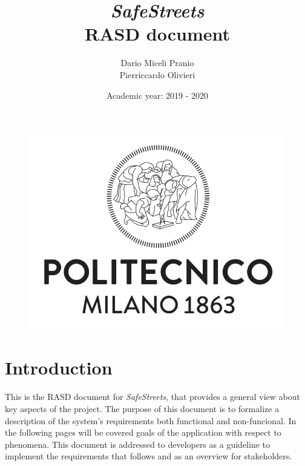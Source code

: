 \documentclass{article}
\title{
    \textbf{\textit{SafeStreets}} \\
    \textbf{RASD document}}
\date{Academic year: 2019 - 2020}
\author{
    Dario Miceli Pranio \\
    Pierriccardo Olivieri
}
\begin{document}

\maketitle

\begin{figure}[h!]
    \centering
    \includegraphics[scale=0.5]{img/logo.png}
\end{figure}

\newpage
{}
\tableofcontents

\newpage
\section{Introduction}
This is the RASD document for \textit{SafeStreets}, that provides a general view about key aspects of the project. 
The purpose of this document is to formalize a description of the system's requirements both functional and non-funcional. 
In the following pages will be covered goals of the application with respect to phenomena. This document is addressed to 
developers as a guideline to implement the requirements that follows and as an overview for stakeholders.
\end{document}
